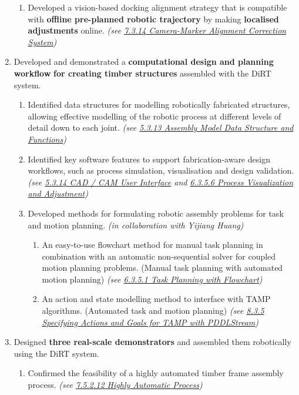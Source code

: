 \documentclass[11pt]{book}
\begin{document}
\begin{enumerate}
\begin{enumerate}
	\item Developed a vision-based docking alignment strategy that is compatible with \textbf{offline pre-planned robotic trajectory} by making \textbf{localised adjustments} online. \textit{(see \uline{7.3.14 Camera-Marker Alignment Correction System})}

\end{enumerate}
	\item Developed and demonstrated a \textbf{computational design and planning workflow} \textbf{for creating timber structures} assembled with the DiRT system.

\begin{enumerate}
	\item Identified data structures for modelling robotically fabricated structures, allowing effective modelling of the robotic process at different levels of detail down to each joint. \textit{(see \uline{5.3.13 Assembly Model Data Structure and Functions})}

	\item Identified key software features to support fabrication-aware design workflows, such as process simulation, visualisation and design validation. \textit{(see \uline{5.3.14 CAD / CAM User Interface} and \uline{6.3.5.6 Process Visualization and Adjustment})}

	\item Developed methods for formulating robotic assembly problems for task and motion planning. \textit{(in collaboration with Yijiang Huang)} 

\begin{enumerate}
	\item An easy-to-use flowchart method for manual task planning in combination with an automatic non-sequential solver for coupled motion planning problems. (Manual task planning with automated motion planning) \textit{(see \uline{6.3.5.1 Task Planning with Flowchart})}

	\item An action and state modelling method to interface with TAMP algorithms. (Automated task and motion planning) \textit{(see \uline{8.3.5 Specifying Actions and Goals for TAMP with PDDLStream})}

\end{enumerate}
\end{enumerate}
	\item Designed \textbf{three real-scale demonstrators} and assembled them robotically using the DiRT system.

\begin{enumerate}
	\item Confirmed the feasibility of a highly automated timber frame assembly process. \textit{(see \uline{7.5.2.12 Highly Automatic Process})}


\end{enumerate}
\end{enumerate}
\end{document}
